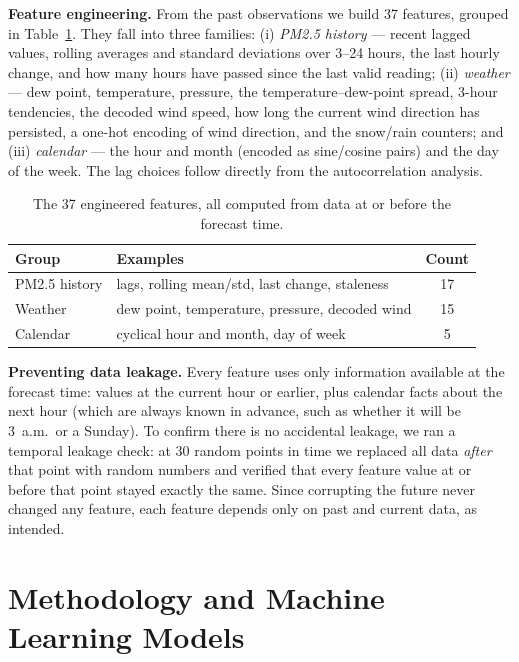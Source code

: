 \documentclass[onecolumn,11pt,journal]{IEEEtran}
\begin{document}
\textbf{Feature engineering.} From the past observations we build 37 features, grouped in Table~\ref{tab:features}. They fall into three families: (i) \emph{PM2.5 history} --- recent lagged values, rolling averages and standard deviations over 3--24 hours, the last hourly change, and how many hours have passed since the last valid reading; (ii) \emph{weather} --- dew point, temperature, pressure, the temperature--dew-point spread, 3-hour tendencies, the decoded wind speed, how long the current wind direction has persisted, a one-hot encoding of wind direction, and the snow/rain counters; and (iii) \emph{calendar} --- the hour and month (encoded as sine/cosine pairs) and the day of the week. The lag choices follow directly from the autocorrelation analysis.

\begin{table}[t]
\centering
\caption{The 37 engineered features, all computed from data at or before the forecast time.}
\label{tab:features}
\setlength{\tabcolsep}{6pt}
\begin{tabular}{llc}
\toprule
Group & Examples & Count \\
\midrule
PM2.5 history & lags, rolling mean/std, last change, staleness & 17 \\
Weather & dew point, temperature, pressure, decoded wind & 15 \\
Calendar & cyclical hour and month, day of week & 5 \\
\bottomrule
\end{tabular}
\end{table}

\textbf{Preventing data leakage.} Every feature uses only information available at the forecast time: values at the current hour or earlier, plus calendar facts about the next hour (which are always known in advance, such as whether it will be 3~a.m.\ or a Sunday). To confirm there is no accidental leakage, we ran a temporal leakage check: at 30 random points in time we replaced all data \emph{after} that point with random numbers and verified that every feature value at or before that point stayed exactly the same. Since corrupting the future never changed any feature, each feature depends only on past and current data, as intended.

\section{Methodology and Machine Learning Models}
\end{document}
